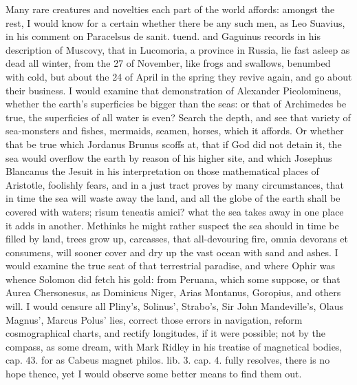 {Many rare creatures and novelties each part of the world affords:
amongst the rest, I would know for a certain whether there be any such
men, as Leo Suavius, in his comment on Paracelsus de sanit. tuend. and
Gaguinus records in his description of Muscovy, that in
Lucomoria, a province in Russia, lie fast asleep as dead all winter,
from the 27 of November, like frogs and swallows, benumbed with cold,
but about the 24 of April in the spring they revive again, and go about
their business. I would examine that demonstration of Alexander
Picolomineus, whether the earth's superficies be bigger than the seas:
or that of Archimedes be true, the superficies of all water is even?
Search the depth, and see that variety of sea-monsters and fishes,
mermaids, seamen, horses, \etc{} which it affords. Or whether that be true
which Jordanus Brunus scoffs at, that if God did not detain it, the sea
would overflow the earth by reason of his higher site, and which
Josephus Blancanus the Jesuit in his interpretation on those
mathematical places of Aristotle, foolishly fears, and in a just tract
proves by many circumstances, that in time the sea will waste away the
land, and all the globe of the earth shall be covered with waters;
risum teneatis amici? what the sea takes away in one place it adds in
another. Methinks he might rather suspect the sea should in time be
filled by land, trees grow up, carcasses, \etc{} that all-devouring fire,
omnia devorans et consumens, will sooner cover and dry up the vast
ocean with sand and ashes. I would examine the true seat of that
terrestrial paradise, and where Ophir was whence Solomon did
fetch his gold: from Peruana, which some suppose, or that Aurea
Chersonesus, as Dominicus Niger, Arias Montanus, Goropius, and others
will. I would censure all Pliny's, Solinus', Strabo's, Sir John
Mandeville's, Olaus Magnus', Marcus Polus' lies, correct those errors
in navigation, reform cosmographical charts, and rectify longitudes, if
it were possible; not by the compass, as some dream, with Mark Ridley
in his treatise of magnetical bodies, cap. 43. for as Cabeus magnet
philos. lib. 3. cap. 4. fully resolves, there is no hope thence, yet I
would observe some better means to find them out.

}
